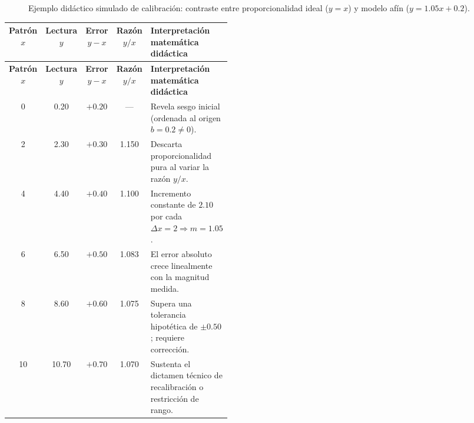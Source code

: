 \documentclass[spanish,letterpaper,oneside]{article}
\begin{document}
\begin{figure}[htbp]
\centering
{}
\caption{Ejemplo didáctico simulado de calibración: contraste entre proporcionalidad ideal ($y=x$) y modelo afín ($y=1.05x+0.2$).}
\label{fig:act8-calibracion}
\end{figure}

{\small{}\renewcommand{\arraystretch}{1.28}
\begin{longtable}{|c|c|c|c|p{0.44\linewidth}|}\hline
\rowcolor{iiiepePale} \textbf{Patrón $x$} & \textbf{Lectura $y$} & \textbf{Error $y-x$} & \textbf{Razón $y/x$} & \textbf{Interpretación matemática didáctica} \\\hline
\endfirsthead
\hline
\rowcolor{iiiepePale} \textbf{Patrón $x$} & \textbf{Lectura $y$} & \textbf{Error $y-x$} & \textbf{Razón $y/x$} & \textbf{Interpretación matemática didáctica} \\\hline
\endhead
0 & 0.20 & $+0.20$ & --- & Revela sesgo inicial (ordenada al origen $b=0.2 \neq 0$). \\\hline
2 & 2.30 & $+0.30$ & 1.150 & Descarta proporcionalidad pura al variar la razón $y/x$. \\\hline
4 & 4.40 & $+0.40$ & 1.100 & Incremento constante de $2.10$ por cada $\Delta x = 2 \Rightarrow m=1.05$. \\\hline
6 & 6.50 & $+0.50$ & 1.083 & El error absoluto crece linealmente con la magnitud medida. \\\hline
8 & 8.60 & $+0.60$ & 1.075 & Supera una tolerancia hipotética de $\pm 0.50$; requiere corrección. \\\hline
10 & 10.70 & $+0.70$ & 1.070 & Sustenta el dictamen técnico de recalibración o restricción de rango. \\\hline
\end{longtable}}
\end{document}
